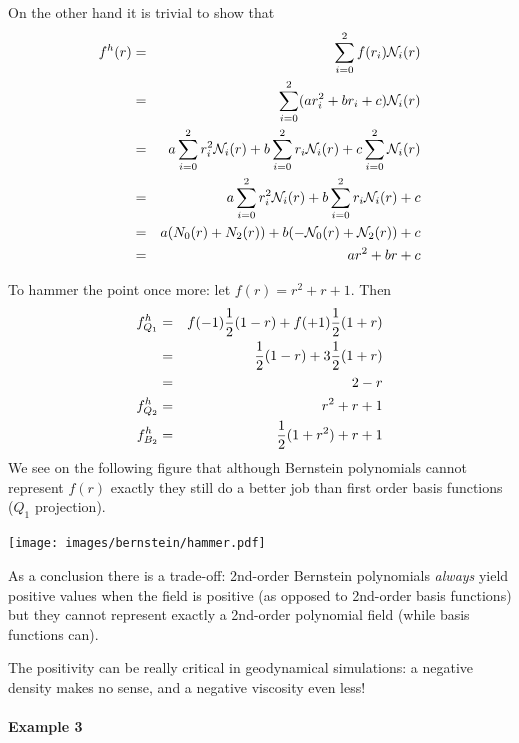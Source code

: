 On the other hand it is trivial to show that 
\begin{eqnarray}
f^h(r) 
&=&  \sum_{i=0}^2 f(r_i) {\mathcal{N}}_i(r) \nonumber \\
&=&  \sum_{i=0}^2   (ar_i^2+br_i+c)  {\mathcal{N}}_i(r) \nonumber \\
&=&  a \sum_{i=0}^2  r_i^2 {\mathcal{N}}_i(r) + b \sum_{i=0}^2 r_i  {\mathcal{N}}_i(r) +  c \sum_{i=0}^2  {\mathcal{N}}_i(r) \nonumber \\
&=&  a \sum_{i=0}^2  r_i^2 {\mathcal{N}}_i(r) + b \sum_{i=0}^2 r_i  {\mathcal{N}}_i(r) +  c \nonumber\\
&=&  a (N_0(r)+N_2(r)) + b (-{\mathcal{N}}_0(r) +{\mathcal{N}}_2(r)) +  c \nonumber\\
&=&  a r^2  + b r+ c 
\end{eqnarray}

To hammer the point once more: let $f(r)=r^2+r+1$.
Then 
\begin{eqnarray}
f^h_{Q_1} 
&=& f(-1) \frac{1}{2}(1-r) + f(+1) \frac{1}{2}(1+r) \nonumber\\
&=&  \frac{1}{2}(1-r) + 3 \frac{1}{2}(1+r) \nonumber\\
&=& 2-r \\
f^h_{Q_2} &=& r^2+r+1 \\
f^h_{B_2} &=& \frac{1}{2} (1+r^2)+r+1 
\end{eqnarray}
We see on the following figure that although Bernstein polynomials cannot 
represent $f(r)$ exactly they still do a better job than first order basis functions
($Q_1$ projection).
\begin{center}
\texttt{[image: images/bernstein/hammer.pdf]}
\end{center}

As a conclusion there is a trade-off: 2nd-order Bernstein polynomials {\it always} yield positive 
values when the field is positive (as opposed to 2nd-order basis functions) but they cannot 
represent exactly a 2nd-order polynomial field (while basis functions can).

The positivity can be really critical in geodynamical simulations: a negative density makes no sense, 
and a negative viscosity even less!

\paragraph{Example 3}

